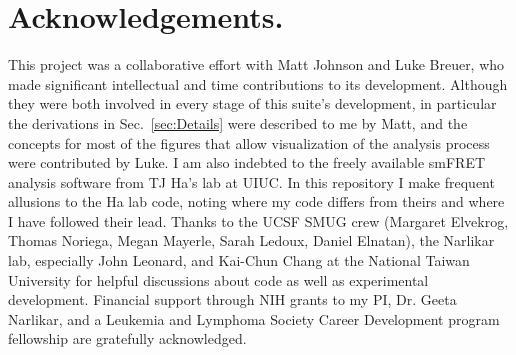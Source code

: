 \documentclass[11pt]{article}
\begin{document}
%
%
%

\newpage

\section{Acknowledgements.}

This project was a collaborative effort with Matt Johnson and Luke Breuer, who made significant intellectual and time contributions to its development.  Although they were both involved in every stage of this suite's development, in particular the derivations in Sec.~\ref{sec:Details} were described to me by Matt, and the concepts for most of the figures that allow visualization of the analysis process were contributed by Luke.  I am also indebted to the freely available smFRET analysis software from TJ Ha's lab at UIUC. In this repository I make frequent allusions to the Ha lab code, noting where my code differs from theirs and where I have followed their lead. Thanks to the UCSF SMUG crew (Margaret Elvekrog, Thomas Noriega, Megan Mayerle, Sarah Ledoux, Daniel Elnatan), the Narlikar lab, especially John Leonard, and Kai-Chun Chang at the National Taiwan University for helpful discussions about code as well as experimental development. %
Financial support through NIH grants to my PI, Dr. Geeta Narlikar, and a Leukemia and Lymphoma Society Career Development program fellowship are gratefully acknowledged.


\end{document}
